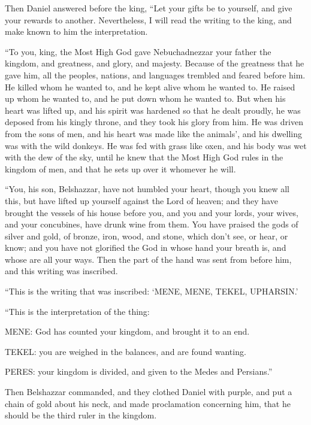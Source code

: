 \myverse{}Then Daniel answered before the king, “Let your gifts be to yourself,
and give your rewards to another. Nevertheless, I will read the writing to the king, and make known to
him the interpretation.

\myverse{}“To you, king, the Most High God gave Nebuchadnezzar your father
the kingdom, and greatness, and glory, and majesty.
\myverse{}Because of the greatness that he gave him, all the peoples, nations, and languages
trembled and feared before him. He killed whom he wanted to, and he kept alive whom he wanted to. He raised
up whom he wanted to, and he put down whom he wanted to.
\myverse{}But when his heart was lifted up, and his spirit was hardened so that he dealt
proudly, he was deposed from his kingly throne, and they took his glory from him.
\myverse{}He was driven from the sons of men, and his heart was made like the animals’,
and his dwelling was with the wild donkeys. He was fed with grass like oxen, and his body was wet with
the dew of the sky, until he knew that the Most High God rules in the kingdom of men, and that he sets
up over it whomever he will.

\myverse{}“You, his son, Belshazzar, have not humbled your heart, though
you knew all this,
\myverse{}but have lifted up yourself against the Lord of heaven; and they have brought
the vessels of his house before you, and you and your lords, your wives, and your concubines, have drunk
wine from them. You have praised the gods of silver and gold, of bronze, iron, wood, and stone, which
don’t see, or hear, or know; and you have not glorified the God in whose hand your breath is, and whose
are all your ways.
\myverse{}Then the part of the hand was sent from before him, and this writing was inscribed.

\myverse{}“This is the writing that was inscribed: ‘MENE, MENE, TEKEL,
UPHARSIN.’

\myverse{}“This is the interpretation of the thing:

MENE: God has counted your kingdom, and brought it to an end.

\myverse{}TEKEL: you are weighed in the balances, and are found
wanting.

\myverse{}PERES: your kingdom is divided, and given to the Medes
and Persians.”

\myverse{}Then Belshazzar commanded, and they clothed Daniel with purple,
and put a chain of gold about his neck, and made proclamation concerning him, that he should be the third
ruler in the kingdom.

